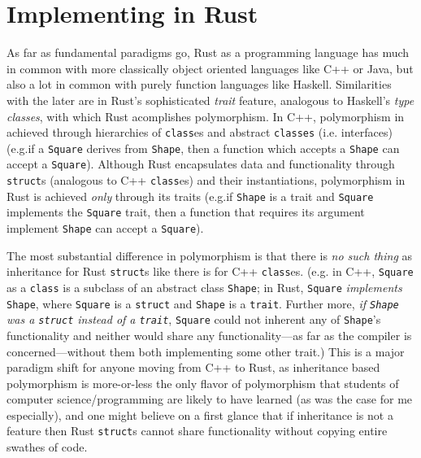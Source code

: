 \documentclass{report}
\begin{document}
\section{Implementing in Rust}

As far as fundamental paradigms go, Rust as a programming language has much in
common with more classically object oriented languages like C++ or Java, but
also a lot in common with purely function languages like Haskell.
Similarities with the later are in Rust's sophisticated \emph{trait} feature,
analogous to Haskell's \emph{type classes}, with which Rust acomplishes
polymorphism.
In C++, polymorphism in achieved through hierarchies of \Verb+class+es and
abstract \Verb+classes+ (i.e. interfaces)
(e.g.\@ if a \Verb+Square+ derives from \Verb+Shape+, then a function which
accepts a \Verb+Shape+ can accept a \Verb+Square+).
Although Rust encapsulates data and functionality through \Verb+struct+s
(analogous to C++ \Verb+class+es) and their instantiations,
polymorphism in Rust is achieved \emph{only} through its traits
(e.g.\@ if \Verb+Shape+ is a trait and \Verb+Square+ implements the \Verb+Square+
trait, then a function that requires its argument implement \Verb+Shape+ can
accept a \Verb+Square+).

The most substantial difference in polymorphism is that there is \emph{no such
thing} as inheritance for Rust \Verb+struct+s like there is for C++
\Verb+class+es. (e.g. in C++, \Verb+Square+ as a \Verb+class+ is a subclass of
an abstract class \Verb+Shape+;
in Rust, \Verb+Square+ \emph{implements} \Verb+Shape+, where \Verb+Square+ is a
\Verb+struct+ and \Verb+Shape+ is a \Verb+trait+. Further more, \emph{if
\Verb+Shape+ was a \Verb+struct+ instead of a \Verb+trait+},
\Verb+Square+ could not inherent any of \Verb+Shape+'s functionality and neither
would share any functionality---as far as the compiler is concerned---without
them both implementing some other trait.)
This is a major paradigm shift for anyone moving from C++ to Rust, as
inheritance based polymorphism is more-or-less the only flavor of polymorphism
that students of computer science/programming are likely to have learned (as was
the case for me especially), and one might believe on a first glance that if
inheritance is not a feature then Rust \Verb+struct+s cannot share functionality
without copying entire swathes of code.
\end{document}
